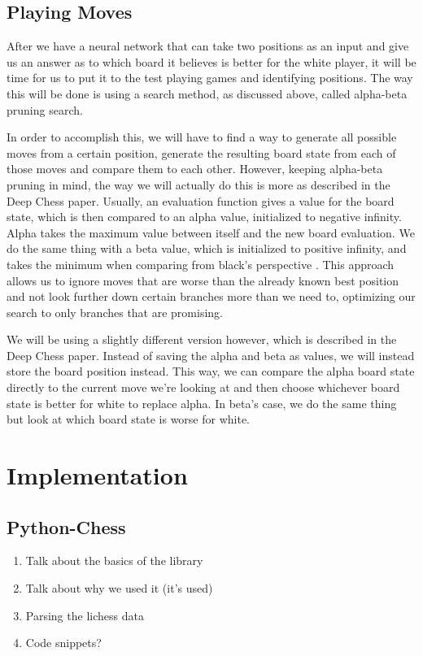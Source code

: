 \documentclass[12pt]{article}
\begin{document}
    \subsection{Playing Moves}

    After we have a neural network that can take two positions as an input and give us an answer as to which board it believes is better for the white player, it will be time for us to put it to the test playing games and identifying positions. The way this will be done is using a search method, as discussed above, called alpha-beta pruning search. 

    In order to accomplish this, we will have to find a way to generate all possible moves from a certain position, generate the resulting board state from each of those moves and compare them to each other. However, keeping alpha-beta pruning in mind, the way we will actually do this is more as described in the Deep Chess paper. Usually, an evaluation function gives a value for the board state, which is then compared to an alpha value, initialized to negative infinity. Alpha takes the maximum value between itself and the new board evaluation. We do the same thing with a beta value, which is initialized to positive infinity, and takes the minimum when comparing from black's perspective \cite{deepchess}. This approach allows us to ignore moves that are worse than the already known best position and not look further down certain branches more than we need to, optimizing our search to only branches that are promising. 

    We will be using a slightly different version however, which is described in the Deep Chess paper. Instead of saving the alpha and beta as values, we will instead store the board position instead. This way, we can compare the alpha board state directly to the current move we're looking at and then choose whichever board state is better for white to replace alpha. In beta's case, we do the same thing but look at which board state is worse for white. 
    
    \section{Implementation}

    \subsection{Python-Chess}

    \begin{enumerate}
        \item Talk about the basics of the library
        \item Talk about why we used it (it's used)
        \item Parsing the lichess data
        \item Code snippets?
    \end{enumerate}
\end{document}
